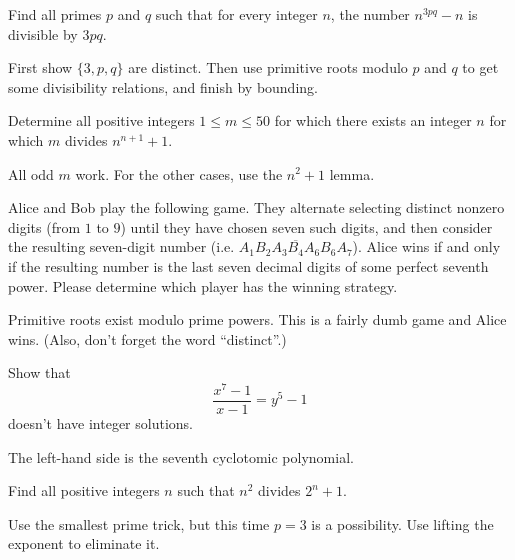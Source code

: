 \documentclass[11pt]{scrartcl}
\begin{document}
\begin{problem}
  Find all primes $p$ and $q$ such that for every integer $n$,
  the number $n^{3pq} - n$ is divisible by $3pq$.
  \begin{hint}
    First show $\{3,p,q\}$ are distinct.
    Then use primitive roots modulo $p$ and $q$
    to get some divisibility relations, and finish by bounding.
  \end{hint}
\end{problem}

\begin{problem}
  \label{prob:hmmt}
  Determine all positive integers $1 \le m \le 50$
  for which there exists an integer $n$
  for which $m$ divides $n^{n+1}+1$.
  \begin{hint}
    All odd $m$ work. For the other cases, use the $n^2+1$ lemma.
  \end{hint}
\end{problem}

\begin{problem}
  Alice and Bob play the following game. They alternate selecting distinct nonzero digits
	(from $1$ to $9$) until they have chosen seven such digits,
	and then consider the resulting seven-digit number (i.e. $\overline{A_1B_2A_3B_4A_6B_6A_7}$).
	Alice wins if and only if the resulting number is the last seven decimal digits of some
	perfect seventh power. Please determine which player has the winning strategy.
  \begin{hint}
    Primitive roots exist modulo prime powers. This is a fairly dumb game and Alice wins.
    (Also, don't forget the word ``distinct''.)
  \end{hint}
\end{problem}

\begin{problem}
  [Shortlist 2006 N5]
  Show that \[ \frac{x^7-1}{x-1} = y^5-1 \] doesn't have integer solutions.
  \begin{hint}
    The left-hand side is the seventh cyclotomic polynomial.
  \end{hint}
\end{problem}

\begin{problem}
  [IMO 1990/3]
  \label{prob:imo90}
  Find all positive integers $n$ such that $n^2$ divides $2^n+1$.
  \begin{hint}
    Use the smallest prime trick, but this time $p=3$ is a possibility.
    Use lifting the exponent to eliminate it.
  \end{hint}
\end{problem}
\end{document}
